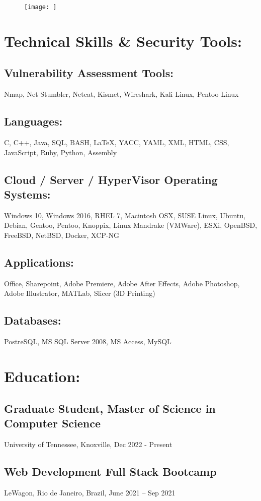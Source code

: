 \documentclass[letter,10pt]{article}
\begin{document}
\begin{figure}
\texttt{[image: ]}
\end{figure}

\section*{Technical Skills \& Security Tools:}
\label{sec:org5fed67a}
\subsection*{Vulnerability Assessment Tools:}
\label{sec:org618c750}
Nmap, Net Stumbler, Netcat, Kismet, Wireshark, Kali Linux, Pentoo Linux
\subsection*{Languages:}
\label{sec:org06b2344}
C, C++, Java, SQL, BASH, \LaTeX{}, YACC, YAML, XML, HTML, CSS, JavaScript, Ruby, Python, Assembly
\subsection*{Cloud / Server / HyperVisor Operating Systems:}
\label{sec:org88dec4c}
Windows 10, Windows 2016, RHEL 7, Macintosh OSX, SUSE Linux, Ubuntu, Debian, Gentoo, Pentoo, Knoppix, Linux Mandrake (VMWare), ESXi, OpenBSD, FreeBSD, NetBSD, Docker, XCP-NG
\subsection*{Applications:}
\label{sec:orgc31b20b}
Office, Sharepoint, Adobe Premiere, Adobe After Effects, Adobe Photoshop, Adobe Illustrator, MATLab, Slicer (3D Printing)
\subsection*{Databases:}
\label{sec:orgcc96c7a}
PostreSQL, MS SQL Server 2008, MS Access, MySQL
\section*{Education:}
\label{sec:org4aa22d6}
\subsection*{Graduate Student, Master of Science in Computer Science}
\label{sec:org11adb33}
University of Tennessee, Knoxville, Dec 2022 - Present
\subsection*{Web Development Full Stack Bootcamp}
\label{sec:org53877ac}
LeWagon, Rio de Janeiro, Brazil, June 2021 – Sep 2021
\end{document}
